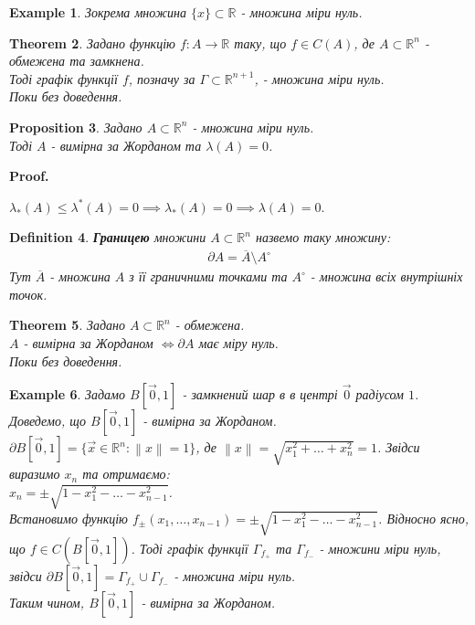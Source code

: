 \documentclass[a4paper, 10pt]{article}
\makeatletter
\def\qed{$\blacksquare$}
\theoremstyle{theoremdd}
\newtheorem{theorem}{Theorem}[subsection]
\theoremstyle{theoremdd}
\newtheorem{definition}[theorem]{Definition}
\theoremstyle{theoremdd}
\theoremstyle{theoremdd}
\newtheorem{example}[theorem]{Example}
\theoremstyle{theoremdd}
\newtheorem{proposition}[theorem]{Proposition}
\theoremstyle{theoremdd}
\theoremstyle{theoremdd}
\theoremstyle{theoremdd}
\renewenvironment{proof}[1][Proof.\\]{\par
\pushQED{\hfill \qed}%
\normalfont \topsep6\p@\@plus6\p@\relax
\trivlist
\item\relax
{\bfseries
#1\@addpunct{.}}\hspace\labelsep\ignorespaces
}{%
\popQED\endtrivlist\@endpefalse
}
\newcommand\Norm[1]{\left\lVert#1\right\rVert}
\makeatother
\begin{document}
\begin{example}
Зокрема множина $\{x\} \subset \mathbb{R}$ - множина міри нуль.
\end{example}

\begin{theorem}
Задано функцію $f: A \to \mathbb{R}$ таку, що $f \in C(A)$, де $A \subset \mathbb{R}^n$ - обмежена та замкнена.\\
Тоді графік функції $f$, позначу за $\Gamma \subset \mathbb{R}^{n+1}$, - множина міри нуль.\\
\textit{Поки без доведення.}
\end{theorem}

\begin{proposition}
Задано $A \subset \mathbb{R}^n$ - множина міри нуль. \\ Тоді $A$ - вимірна за Жорданом та $\lambda(A) = 0$.
\end{proposition}

\begin{proof}
$\lambda_*(A) \leq \lambda^*(A) = 0 \implies \lambda_*(A) = 0 \implies \lambda(A) = 0$.
\end{proof}

\begin{definition}
\textbf{Границею} множини $A \subset \mathbb{R}^n$ назвемо таку множину:
\begin{align*}
\partial A = \overline{A} \setminus A^\circ
\end{align*}
Тут $\overline{A}$ - множина $A$ з її граничними точками та $A^\circ$ - множина всіх внутрішніх точок.
\end{definition}

\begin{theorem}
Задано $A \subset \mathbb{R}^n$ - обмежена.\\
$A$ - вимірна за Жорданом $\iff \partial A$ має міру нуль.\\
\textit{Поки без доведення.}
\end{theorem}

\begin{example}
Задамо $B[\vec{0},1]$ - замкнений шар в в центрі $\vec{0}$ радіусом $1$. Доведемо, що $B[\vec{0},1]$ - вимірна за Жорданом.\\
$\partial B[\vec{0},1] = \{ \vec{x} \in \mathbb{R}^n: \Norm{x} = 1 \}$, де $\Norm{x} = \sqrt{x_1^2+\dots+x_n^2} = 1$. Звідси виразимо $x_n$ та отримаємо:\\
$x_n = \pm \sqrt{1-x_1^2-\dots-x_{n-1}^2}$.\\
Встановимо функцію $f_{\pm}(x_1,\dots,x_{n-1}) = \pm \sqrt{1-x_1^2-\dots-x_{n-1}^2}$. Відносно ясно, що $f \in C(B[\vec{0},1])$. Тоді графік функції $\Gamma_{f_+}$ та $\Gamma_{f_-}$ - множини міри нуль, звідси $\partial B[\vec{0},1] = \Gamma_{f_+} \cup \Gamma_{f_-}$ - множина міри нуль.\\
Таким чином, $B[\vec{0},1]$ - вимірна за Жорданом.
\end{example}
\end{document}
